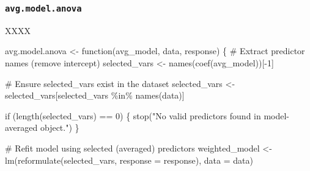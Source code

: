 \documentclass[
  bookmarksnumbered]{article}
\newenvironment{Shaded}{\begin{snugshade}}{\end{snugshade}}
\newcommand{\AttributeTok}[1]{\textcolor[rgb]{0.80,0.80,0.80}{#1}}
\newcommand{\CommentTok}[1]{\textcolor[rgb]{0.50,0.62,0.50}{#1}}
\newcommand{\ControlFlowTok}[1]{\textcolor[rgb]{0.94,0.87,0.69}{#1}}
\newcommand{\DecValTok}[1]{\textcolor[rgb]{0.86,0.86,0.80}{#1}}
\newcommand{\FunctionTok}[1]{\textcolor[rgb]{0.94,0.94,0.56}{#1}}
\newcommand{\NormalTok}[1]{\textcolor[rgb]{0.80,0.80,0.80}{#1}}
\newcommand{\OtherTok}[1]{\textcolor[rgb]{0.94,0.94,0.56}{#1}}
\newcommand{\SpecialCharTok}[1]{\textcolor[rgb]{0.86,0.64,0.64}{#1}}
\newcommand{\StringTok}[1]{\textcolor[rgb]{0.80,0.58,0.58}{#1}}
\begin{document}
\subsubsection{\texorpdfstring{\texttt{avg.model.anova}}{avg.model.anova}}\label{avg.model.anova}

XXXX

\begin{Shaded}
\begin{Highlighting}[]
\NormalTok{avg.model.anova }\OtherTok{\textless{}{-}} \ControlFlowTok{function}\NormalTok{(avg\_model, data, response) \{}
  \CommentTok{\# Extract predictor names (remove intercept)}
\NormalTok{  selected\_vars }\OtherTok{\textless{}{-}} \FunctionTok{names}\NormalTok{(}\FunctionTok{coef}\NormalTok{(avg\_model))[}\SpecialCharTok{{-}}\DecValTok{1}\NormalTok{]}
  
  \CommentTok{\# Ensure selected\_vars exist in the dataset}
\NormalTok{  selected\_vars }\OtherTok{\textless{}{-}}\NormalTok{ selected\_vars[selected\_vars }\SpecialCharTok{\%in\%} \FunctionTok{names}\NormalTok{(data)]}
  
  \ControlFlowTok{if}\NormalTok{ (}\FunctionTok{length}\NormalTok{(selected\_vars) }\SpecialCharTok{==} \DecValTok{0}\NormalTok{) \{}
    \FunctionTok{stop}\NormalTok{(}\StringTok{"No valid predictors found in model{-}averaged object."}\NormalTok{)}
\NormalTok{  \}}
  
  \CommentTok{\# Refit model using selected (averaged) predictors}
\NormalTok{  weighted\_model }\OtherTok{\textless{}{-}} \FunctionTok{lm}\NormalTok{(}\FunctionTok{reformulate}\NormalTok{(selected\_vars, }\AttributeTok{response =}\NormalTok{ response), }\AttributeTok{data =}\NormalTok{ data)}
  

\end{Highlighting}
\end{Shaded}
\end{document}
